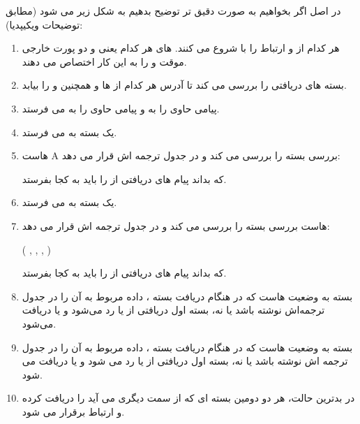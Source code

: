 \documentclass[12pt]{article}
\begin{document}
در اصل اگر بخواهیم به صورت دقیق تر توضیح بدهیم به شکل زیر می شود (مطابق توضیحات ویکیپدیا):

\begin{enumerate}
	\item 
	هر کدام از  و  ارتباط  را با  شروع می کنند.  های هر کدام یعنی  و  دو پورت خارجی موقت  و  را به این کار اختصاص می دهند.
	
	\item
	بسته های دریافتی را بررسی  می کند تا آدرس  هر کدام از  ها و همچنین  و  را بیابد.
	\item
	پیامی حاوی  را به  و پیامی حاوی  را به  می فرستد.
	
	\item
	یک بسته به  می فرستد.
	
	\item
	هاست A بررسی بسته را بررسی می کند و در جدول ترجمه اش قرار می دهد:
	
	
	که بداند پیام های دریافتی از  را باید به کجا بفرستد.
	
	\item
{}
یک بسته به  می فرستد.

\item
{}
هاست  بررسی بسته را بررسی می کند و در جدول ترجمه اش قرار می دهد:

( , ,  , )

که بداند پیام های دریافتی از  را باید به کجا بفرستد.


\item
بسته به وضعیت  هاست  که در هنگام دریافت بسته ، داده مربوط به آن را در جدول ترجمه‌اش نوشته باشد یا نه، بسته اول دریافتی از  یا رد می‌شود و یا دریافت می‌شود.



\item
بسته به وضعیت  هاست  که در هنگام دریافت بسته ، داده مربوط به آن را در جدول ترجمه اش نوشته باشد یا نه، بسته اول دریافتی از  یا رد می شود و یا دریافت می شود.


\item

در بدترین حالت، هر دو دومین بسته ای که از سمت دیگری می آید را دریافت کرده و ارتباط برقرار می شود.




\end{enumerate}
\end{document}

